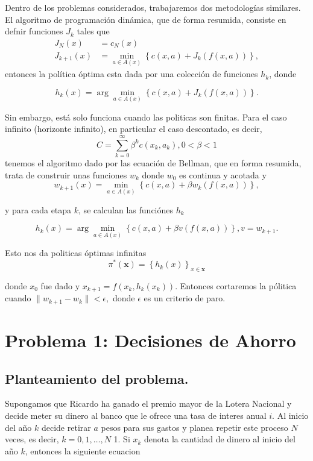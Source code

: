 \documentclass[oneside,spanish]{amsbook}
\numberwithin{section}{chapter}
\numberwithin{equation}{section}
\numberwithin{figure}{section}
\begin{document}
Dentro de los problemas considerados, trabajaremos dos metodologías
similares. El algoritmo de programación dinámica, que de forma resumida,
consiste en defnir funciones $J_{k}$ tales que 
\begin{align*}
J_{N}\left(x\right) & =c_{N}\left(x\right)\\
J_{k+1}\left(x\right) & =\min_{a\in A\left(x\right)}\left\{ c\left(x,a\right)+J_{k}\left(f(x,a)\right)\right\} ,
\end{align*}
entonces la política óptima esta dada por una colección de funciones
$h_{k}$, donde 

\[
h_{k}\left(x\right)=\arg\min_{a\in A(x)}\left\{ c\left(x,a\right)+J_{k}\left(f(x,a)\right)\right\} .
\]

Sin embargo, está solo funciona cuando las politicas son finitas.
Para el caso infinito (horizonte infinito), en particular el caso
descontado, es decir, 
\[
C=\sum_{k=0}^{\infty}\beta^{k}c(x_{k},a_{k}),0<\beta<1
\]
 tenemos el algoritmo dado por las ecuación de Bellman, que en forma
resumida, trata de construir unas funciones $w_{k}$ donde $w_{0}$
es continua y acotada y 
\[
w_{k+1}\left(x\right)=\min_{a\in A(x)}\left\{ c\left(x,a\right)+\beta w_{k}\left(f(x,a)\right)\right\} ,
\]

y para cada etapa $k$, se calculan las funciónes $h_{k}$

\[
h_{k}\left(x\right)=\arg\min_{a\in A(x)}\left\{ c\left(x,a\right)+\beta v\left(f(x,a)\right)\right\} ,v=w_{k+1}.
\]

Esto nos da politicas óptimas infinitas 
\[
\pi^{*}(\mathbf{x})=\left\{ h_{k}(x)\right\} _{x\in\mathbf{x}}
\]

donde $x_{0}$ fue dado y $x_{k+1}=f(x_{k},h_{k}(x_{k}))$. Entonces
cortaremos la pólitica cuando $\|w_{k+1}-w_{k}\|<\epsilon,$ donde
$\epsilon$ es un criterio de paro. 

\chapter{Problema 1: Decisiones de Ahorro}

\section{Planteamiento del problema. }

Supongamos que Ricardo ha ganado el premio mayor de la Lotera Nacional
y decide meter su dinero al banco que le ofrece una tasa de interes
anual $i$. Al inicio del año $k$ decide retirar $a$ pesos para
sus gastos y planea repetir este proceso $N$ veces, es decir, $k=0,1,\ldots,N$
1. Si $x_{k}$ denota la cantidad de dinero al inicio del año $k$,
entonces la siguiente ecuacion
\end{document}
